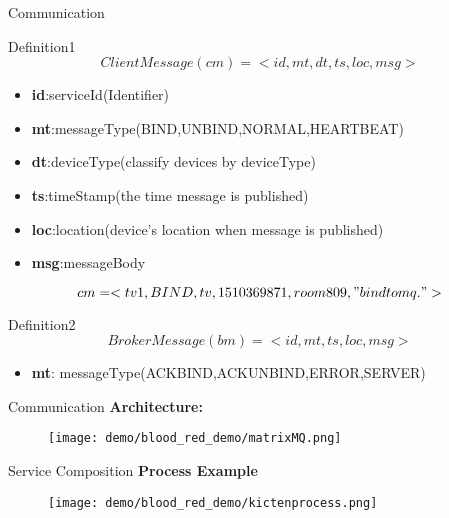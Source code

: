 \documentclass[notheorems, aspectratio=54]{beamer}
\begin{document}
\begin{frame}{Communication}
    \begin{block}{Definition1}
    $$ClientMessage(cm)=<id,mt,dt,ts,loc,msg>$$
    \end{block}
    \begin{itemize}
        \item \textbf{id}:serviceId(Identifier)
        \item \textbf{mt}:messageType(BIND,UNBIND,NORMAL,HEARTBEAT)
        \item \textbf{dt}:deviceType(classify devices by deviceType)
        \item \textbf{ts}:timeStamp(the time message is published)
        \item \textbf{loc}:location(device's location when message is published)
        \item \textbf{msg}:messageBody
    \end{itemize}
    $$cm = <tv1,BIND,tv,1510369871,room809,"bind to mq.">$$
    \begin{block}{Definition2}
    $$BrokerMessage(bm)=<id,mt,ts,loc,msg>$$
    \end{block}
    \begin{itemize}
        \item \textbf{mt}: messageType(ACKBIND,ACKUNBIND,ERROR,SERVER)
    \end{itemize}
\end{frame}

\begin{frame}{Communication}
    \textbf{Architecture:}
    \begin{figure}[t]
     \texttt{[image: demo/blood\_red\_demo/matrixMQ.png]}
    \centering
    \end{figure}
    
\end{frame}

\begin{frame}{Service Composition}
    \textbf{Process Example}
 \begin{figure}[t]
     \texttt{[image: demo/blood\_red\_demo/kictenprocess.png]}
    \centering
    \end{figure}
\end{frame}
\end{document}
